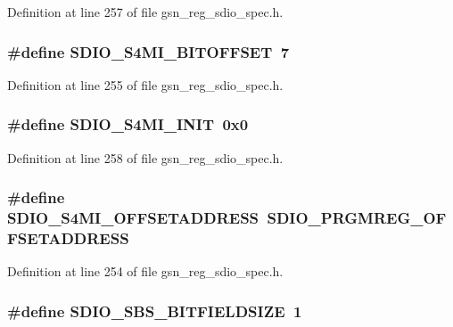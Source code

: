 Definition at line 257 of file gsn\_\-reg\_\-sdio\_\-spec.h.

\hypertarget{a00571_a519444cd44786371cec7d9ea225377ec}{
\subsubsection[{SDIO\_\-S4MI\_\-BITOFFSET}]{\setlength{\rightskip}{0pt plus 5cm}\#define SDIO\_\-S4MI\_\-BITOFFSET~7}}
\label{a00571_a519444cd44786371cec7d9ea225377ec}


Definition at line 255 of file gsn\_\-reg\_\-sdio\_\-spec.h.

\hypertarget{a00571_aaf3e0ba9d1a05e18bb227d263e9e1a58}{
\subsubsection[{SDIO\_\-S4MI\_\-INIT}]{\setlength{\rightskip}{0pt plus 5cm}\#define SDIO\_\-S4MI\_\-INIT~0x0}}
\label{a00571_aaf3e0ba9d1a05e18bb227d263e9e1a58}


Definition at line 258 of file gsn\_\-reg\_\-sdio\_\-spec.h.

\hypertarget{a00571_af7dc69d26417078dbe30b6ca0c4bf6ea}{
\subsubsection[{SDIO\_\-S4MI\_\-OFFSETADDRESS}]{\setlength{\rightskip}{0pt plus 5cm}\#define SDIO\_\-S4MI\_\-OFFSETADDRESS~SDIO\_\-PRGMREG\_\-OFFSETADDRESS}}
\label{a00571_af7dc69d26417078dbe30b6ca0c4bf6ea}


Definition at line 254 of file gsn\_\-reg\_\-sdio\_\-spec.h.

\hypertarget{a00571_ae14a40157cc5ba05e4569db3d2052310}{
\subsubsection[{SDIO\_\-SBS\_\-BITFIELDSIZE}]{\setlength{\rightskip}{0pt plus 5cm}\#define SDIO\_\-SBS\_\-BITFIELDSIZE~1}}
\label{a00571_ae14a40157cc5ba05e4569db3d2052310}


